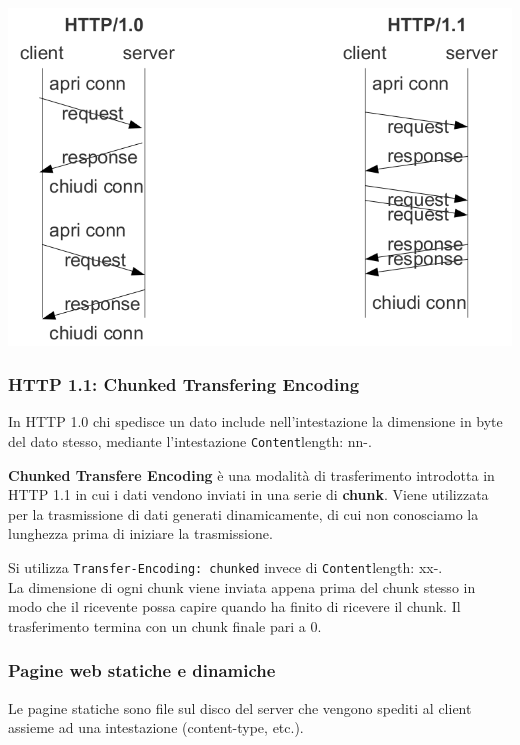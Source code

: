             \begin{center}
                \includegraphics[scale=0.4]{chapters/6/assets/schema_o.png}
            \end{center}

        \subsubsection{HTTP 1.1: Chunked Transfering Encoding}
            In HTTP 1.0 chi spedisce un dato include nell'intestazione la dimensione in byte del dato stesso, mediante l'intestazione \verb-Content-length: nn-.
        
            \textbf{Chunked Transfere Encoding} è una modalità di trasferimento introdotta in HTTP 1.1 in cui i dati vendono inviati in una serie di \textbf{chunk}. Viene utilizzata per la trasmissione di dati generati dinamicamente, di cui non conosciamo la lunghezza prima di iniziare la trasmissione.
        
            Si utilizza \verb=Transfer-Encoding: chunked= invece di \verb-Content-length: xx-.\\
            La dimensione di ogni chunk viene inviata appena prima del chunk stesso in modo che il ricevente possa capire quando ha finito di ricevere il chunk. Il trasferimento termina con un chunk finale pari a 0.
            
            

        \subsubsection{Pagine web statiche e dinamiche}
            Le pagine statiche sono file sul disco del server che vengono spediti al client assieme ad una intestazione (content-type, etc.).
        
